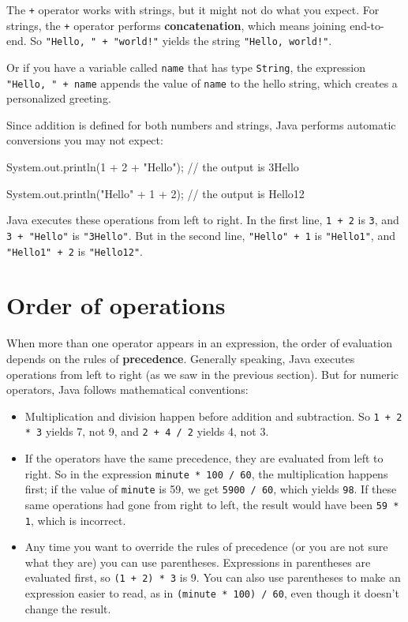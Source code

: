 \documentclass[12pt]{book}
\theoremstyle{exercise}
\newcommand{\java}[1]{\verb"#1"}
\begin{document}
The \java{+} operator works with strings, but it might not do what you expect.
For strings, the \java{+} operator performs {\bf concatenation}, which means joining end-to-end.
So \verb|"Hello, " + "world!"| yields the string \verb|"Hello, world!"|.

Or if you have a variable called \java{name} that has type \java{String}, the expression \verb|"Hello, " + name| appends the value of \java{name} to the hello string, which creates a personalized greeting.

Since addition is defined for both numbers and strings, Java performs automatic conversions you may not expect:

\begin{code}
    System.out.println(1 + 2 + "Hello");
    // the output is 3Hello

    System.out.println("Hello" + 1 + 2);
    // the output is Hello12
\end{code}

Java executes these operations from left to right.
In the first line, \java{1 + 2} is \java{3}, and \verb|3 + "Hello"| is \verb|"3Hello"|.
But in the second line, \verb|"Hello" + 1| is \verb|"Hello1"|, and \verb|"Hello1" + 2| is \verb|"Hello12"|.


\section{Order of operations}


When more than one operator appears in an expression, the order of evaluation depends on the rules of {\bf precedence}.
Generally speaking, Java executes operations from left to right (as we saw in the previous section).
But for numeric operators, Java follows mathematical conventions:

\begin{itemize}

\item Multiplication and division happen before addition and subtraction.
So \java{1 + 2 * 3} yields 7, not 9, and \java{2 + 4 / 2} yields 4, not 3.

\item If the operators have the same precedence, they are evaluated from left to right.
So in the expression \java{minute * 100 / 60}, the multiplication happens first; if the value of \java{minute} is 59, we get \java{5900 / 60}, which yields \java{98}.
If these same operations had gone from right to left, the result would have been \java{59 * 1}, which is incorrect.

\item Any time you want to override the rules of precedence (or you are not sure what they are) you can use parentheses.
Expressions in parentheses are evaluated first, so \java{(1 + 2) * 3} is 9.
You can also use parentheses to make an expression easier to read, as in \java{(minute * 100) / 60}, even though it doesn't change the result.

\end{itemize}
\end{document}
